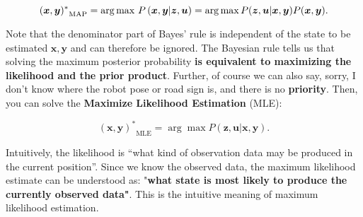 \begin{equation}
{(\bm{x},\bm{y})^*}_{\mathrm{MAP}} = \arg {\mathop{\rm max}\nolimits}\ P \left( {\bm{x} ,\bm{y}|\bm{z},\bm{u}} \right) = \arg \max P(\bm{z},\bm{u}|\bm{x},\bm{ y})P(\bm{x},\bm{y}).
\end{equation}

Note that the denominator part of Bayes' rule is independent of the state to be estimated $\bm{x}, \bm{y}$ and can therefore be ignored. The Bayesian rule tells us that solving the maximum posterior probability \textbf{ is equivalent to maximizing the likelihood and the prior product}. Further, of course we can also say, sorry, I don't know where the robot pose or road sign is, and there is no \textbf{priority}. Then, you can solve the \textbf{Maximize Likelihood Estimation} (MLE):
 
\begin{equation}
{ (\bm{x},\bm{y})^*}_{\mathrm{MLE}} = \arg \max P( \bm{z},\bm{u}| \bm{x}, \bm{y}).
\end{equation}

Intuitively, the likelihood is “what kind of observation data may be produced in the current position”. Since we know the observed data, the maximum likelihood estimate can be understood as: "\textbf{what state is most likely to produce the currently observed data"}. This is the intuitive meaning of maximum likelihood estimation.
